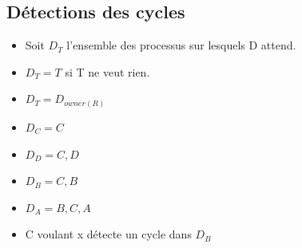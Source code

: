 \begin{frame}{\sectitle}
\begin{block}{\subsectitle}
\def\subsectitle{Détections des cycles}
\subsection{\subsectitle}
\begin{itemize}
    \item Soit $D_{T}$ l'ensemble des processus sur lesquels D attend.
    \item $D_{T} = T$ si T ne veut rien.
    \item $D_{T} = D_{owner(R)}$
\end{itemize}
\end{block}

\begin{exampleblock}{\subsectitle}
\begin{itemize}
    \item $D_{C} = {C}$
    \item $D_{D} = {C,D}$
    \item $D_{B} = {C,B}$
    \item $D_{A} = {B,C,A}$
    \item C voulant x détecte un cycle dans $D_{B}$
\end{itemize}
\end{exampleblock}

\end{frame}


\def\sectitle{Sémaphores}
